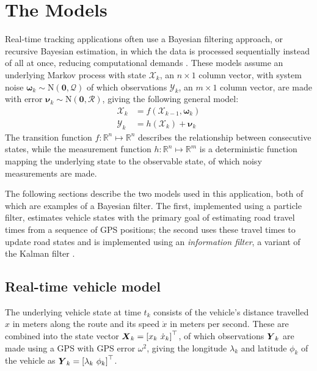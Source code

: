 \section{The Models}
\label{sec:models}

Real-time tracking applications often use
a Bayesian filtering approach,
or recursive Bayesian estimation,
in which the data is processed sequentially instead of all at once,
reducing computational demands
\citep{Anderson_2012}.
These models assume an underlying Markov process with state $\boldsymbol{\mathcal{X}}_k$,
an $n\times1$ column vector,
with system noise $\boldsymbol{\omega}_k\sim\mathrm{N}(\boldsymbol{0},\mathcal{Q})$ 
of which observations $\boldsymbol{\mathcal{Y}}_k$,
an $m\times1$ column vector, are made
with error $\boldsymbol{\nu}_k\sim\mathrm{N}(\boldsymbol{0},\mathcal{R})$,
giving the following general model:
\begin{equation}
\label{eq:rbe_model}
\begin{split}
\boldsymbol{\mathcal{X}}_k &= f(\boldsymbol{\mathcal{X}}_{k-1}, \boldsymbol{\omega}_k) \\
\boldsymbol{\mathcal{Y}}_k &= h(\boldsymbol{\mathcal{X}}_k) + \boldsymbol{\nu}_k
\end{split}
\end{equation}
The transition function $f:\mathbb{R}^n\mapsto\mathbb{R}^n$ 
describes the relationship between consecutive states,
while the measurement function $h:\mathbb{R}^n\mapsto\mathbb{R}^m$ is a deterministic function
mapping the underlying state to the observable state,
of which noisy measurements are made.



The following sections describe the two models used in this application,
both of which are examples of a Bayesian filter.
The first, implemented using a particle filter, estimates vehicle states
with the primary goal of estimating road travel times from a sequence of GPS positions;
the second uses these travel times to update road states 
and is implemented using an \emph{information filter},
a variant of the Kalman filter \citep{Anderson_2012}.

\subsection{Real-time vehicle model}
\label{sec:pf}

The underlying vehicle state at time $t_k$ consists of
the vehicle's distance travelled $x$ in meters along the route and
its speed $\dot x$ in meters per second.
These are combined into the state vector
$\mbox{$\boldsymbol{X}$}_k = \left[x_k\ \dot x_k\right]^\top$,
of which observations $\mbox{$\boldsymbol{Y}$}_k$ are made using a GPS
with GPS error $\omega^2$,
giving the longitude $\lambda_k$ and latitude $\phi_k$ of the vehicle
as $\bY_k = \left[\lambda_k\ \phi_k \right]^\top$.

